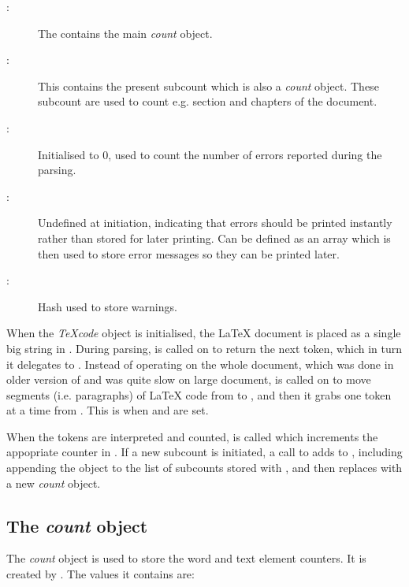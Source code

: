 \documentclass{article}
\newcommand\Obj[1]{\textsl{#1}}
\begin{document}
\begin{description}
\item[:] The contains the main \Obj{count} object.

\item[:] This contains the present subcount which is also a \Obj{count} object. These subcount are used to count e.g. section and chapters of the document.

\item[:] Initialised to 0, used to count the number of errors reported during the parsing.

\item[:] Undefined at initiation, indicating that errors should be printed instantly rather than stored for later printing. Can be defined as an array which is then used to store error messages so they can be printed later.

\item[:] Hash used to store warnings.

\end{description}

When the \Obj{TeXcode} object is initialised, the \LaTeX{} document is placed as a single big string in . During parsing,  is called on to return the next token, which in turn it delegates to . Instead of operating on the whole document, which was done in older version of \TeXcount{} and was quite slow on large document,  is called on to move segments (i.e. paragraphs) of \LaTeX{} code from  to , and then it grabs one token at a time from . This is when  and  are set.

When the tokens are interpreted and counted,  is called which increments the appopriate counter in . If a new subcount is initiated, a call to  adds  to , including appending the  object to the list of subcounts stored with , and then replaces  with a new \Obj{count} object.


\subsection{The \Obj{count} object}

The \Obj{count} object is used to store the word and text element counters. It is created by . The values it contains are:
\end{document}
